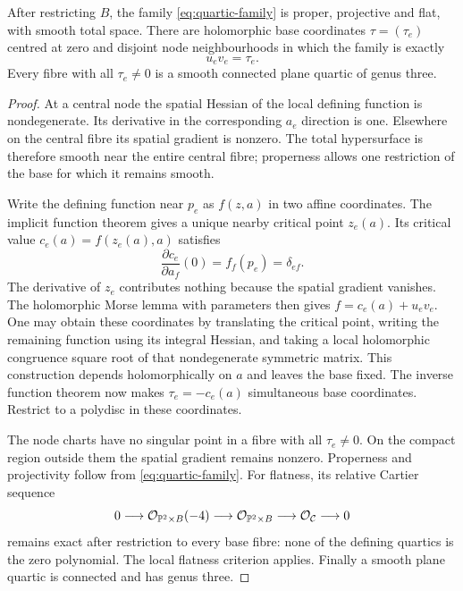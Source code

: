 \begin{proposition}\label{prop:compact-family}
After restricting $B$, the family \eqref{eq:quartic-family} is
proper, projective and flat, with smooth total space. There are
holomorphic base coordinates $\tau=(\tau_e)$ centred at zero and
disjoint node neighbourhoods in which the family is exactly
\begin{equation}\label{eq:node}
 u_ev_e=\tau_e.
\end{equation}
Every fibre with all $\tau_e\ne0$ is a smooth connected plane
quartic of genus three.
\end{proposition}
\begin{proof}
At a central node the spatial Hessian of the local defining
function is nondegenerate. Its derivative in the corresponding
$a_e$ direction is one. Elsewhere on the central fibre its spatial
gradient is nonzero. The total hypersurface is therefore smooth
near the entire central fibre; properness allows one restriction
of the base for which it remains smooth.

Write the defining function near $p_e$ as $f(z,a)$ in two affine
coordinates. The implicit function theorem gives a unique nearby
critical point $z_e(a)$. Its critical value $c_e(a)=f(z_e(a),a)$
satisfies
\[
 \frac{\partial c_e}{\partial a_f}(0)=f_f(p_e)=\delta_{ef}.
\]
The derivative of $z_e$ contributes nothing because the spatial
gradient vanishes. The holomorphic Morse lemma with parameters
then gives $f=c_e(a)+u_ev_e$. One may obtain these coordinates by
translating the critical point, writing the remaining function
using its integral Hessian, and taking a local holomorphic
congruence square root of that nondegenerate symmetric matrix.
This construction depends holomorphically on $a$ and leaves the
base fixed. The inverse function theorem now makes
$\tau_e=-c_e(a)$ simultaneous base coordinates. Restrict to a
polydisc in these coordinates.

The node charts have no singular point in a fibre with all
$\tau_e\ne0$. On the compact region outside them the spatial
gradient remains nonzero. Properness and projectivity follow
from \eqref{eq:quartic-family}. For flatness, its relative
Cartier sequence
\[
 0\longrightarrow\mathcal O_{\mathbb P^2\times B}(-4)
 \longrightarrow\mathcal O_{\mathbb P^2\times B}
 \longrightarrow\mathcal O_{\mathcal C}\longrightarrow0
\]
remains exact after restriction to every base fibre: none of
the defining quartics is the zero polynomial. The local
flatness criterion applies. Finally a smooth plane quartic
is connected and has genus three.
\end{proof}

